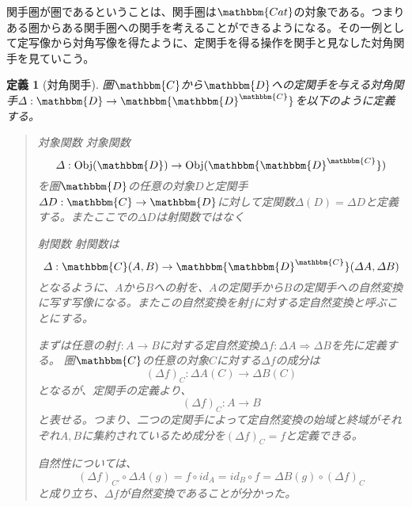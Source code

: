 \documentclass[uplatex,dvipdfmx]{jsarticle}
\newcommand{\cat}[1]{\mathbbm{#1}}
\newcommand{\arrow}{\rightarrow}
\newcommand{\functor}[3]{#1:\cat{#2}\arrow \cat{#3}}
\newcommand{\nat}[3]{#1:#2\Rightarrow #3}
\newcommand{\obj}[1]{\mathrm{Obj}(\cat{#1})}
\newcommand{\mor}[3]{#1:#2\arrow #3}
\newcommand{\arset}[3]{\cat{#1}(#2,#3)}
\newcommand{\funccat}[2]{\cat{#2}^\cat{#1}}
\newtheorem{define}[proof]{定義}
\numberwithin{proof}{subsection}
\newenvironment{mydescription}
{\begin{description}
  \setlength{\parskip}{0.5cm}
}
{\end{description}}
\begin{document}
  関手圏が圏であるということは、関手圏は$\cat{Cat}$の対象である。つまりある圏からある関手圏への関手を考えることができるようになる。その一例として定写像から対角写像を得たように、定関手を得る操作を関手と見なした対角関手を見ていこう。\\
  \begin{define}[対角関手]
    圏$\cat{C}$から$\cat{D}$への定関手を与える対角関手$\functor{\varDelta}{D}{\funccat{C}{D}}$を以下のように定義する。
    \begin{quote}
			\begin{mydescription}
				\item[対象関数] 対象関数\[\mor{\varDelta}{\obj{D}}{\obj{\funccat{C}{D}}}\]
				を圏$\cat{D}$の任意の対象$D$と定関手$\functor{\varDelta D}{C}{D}$に対して定関数$\varDelta(D)=\varDelta D$と定義する。またここでの$\varDelta D$は射関数ではなく
				\item[射関数] 
        射関数は\[\mor{\varDelta}{\arset{C}{A}{B}}{\arset{\funccat{C}{D}}{\varDelta A}{\varDelta B}}\]となるように、$A$から$B$への射を、$A$の定関手から$B$の定関手への自然変換に写す写像になる。またこの自然変換を射$f$に対する定自然変換と呼ぶことにする。

        まずは任意の射$\mor{f}{A}{B}$に対する定自然変換$\nat{\varDelta f}{\varDelta A}{\varDelta B}$を先に定義する。
        圏$\cat{C}$の任意の対象$C$に対する$\varDelta f$の成分は\[\mor{(\varDelta f)_C}{\varDelta A(C)}{\varDelta B(C)}\]となるが、定関手の定義より、\[\mor{(\varDelta f)_C}{A}{B}\]と表せる。つまり、二つの定関手によって定自然変換の始域と終域がそれぞれ$A,B$に集約されているため成分を$(\varDelta f)_C=f$と定義できる。

        自然性については、\[(\varDelta f)_{C'}\circ\varDelta A(g)=f\circ id_A=id_B\circ f=\varDelta B(g)\circ(\varDelta f)_C\]と成り立ち、$\varDelta f$が自然変換であることが分かった。

        \begin{center}
\end{center}
\end{mydescription}
\end{quote}
\end{define}
\end{document}
